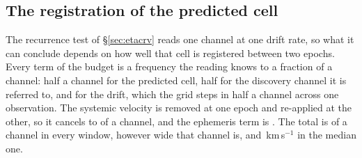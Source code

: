 \subsection{The registration of the predicted cell}
\label{sec:regbudget}

The recurrence test of \S\ref{sec:etacrv} reads one channel at one drift
rate, so what it can conclude depends on how well that cell is registered
between two epochs. Every term of the budget is a frequency the reading
knows to a fraction of a channel: half a channel for the predicted cell,
half for the discovery channel it is referred to, and \RgDriftWithinChMed{}
for the drift, which the grid steps in half a channel across one
observation. The systemic velocity is removed at one epoch and re-applied at
the other, so it cancels to \RgVsysChMax{} of a channel, and the ephemeris
term is \RgBaryChMax. The total is \RgBudgetChMed{} of a channel in every
window, however wide that channel is, and \RgBudgetKmsMed\,km\,s$^{-1}$ in
the median one.

